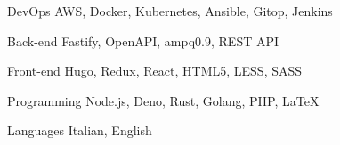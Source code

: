 

\begin{cvskills}

  \cvskill
    {DevOps} %
    {AWS, Docker, Kubernetes, Ansible, Gitop, Jenkins} %

  \cvskill
    {Back-end} %
    {Fastify, OpenAPI, ampq0.9, REST API} %

  \cvskill
    {Front-end} %
    {Hugo, Redux, React, HTML5, LESS, SASS} %

  \cvskill
    {Programming} %
    {Node.js, Deno, Rust, Golang, PHP, LaTeX} %

  \cvskill
    {Languages} %
    {Italian, English} %

\end{cvskills}